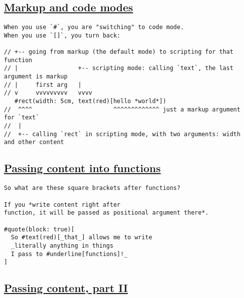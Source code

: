 \pandocbounded{}

\subsection{\texorpdfstring{\hyperref[markup-and-code-modes]{Markup and
code modes}}{Markup and code modes}}\label{markup-and-code-modes}

\begin{verbatim}
When you use `#`, you are "switching" to code mode.
When you use `[]`, you turn back:

// +-- going from markup (the default mode) to scripting for that function
// |                 +-- scripting mode: calling `text`, the last argument is markup
// |     first arg   |
// v     vvvvvvvvv   vvvv
   #rect(width: 5cm, text(red)[hello *world*])
//  ^^^^                       ^^^^^^^^^^^^^ just a markup argument for `text`
//  |
//  +-- calling `rect` in scripting mode, with two arguments: width and other content
\end{verbatim}

\pandocbounded{}

\subsection{\texorpdfstring{\hyperref[passing-content-into-functions]{Passing
content into
functions}}{Passing content into functions}}\label{passing-content-into-functions}

\begin{verbatim}
So what are these square brackets after functions?

If you *write content right after
function, it will be passed as positional argument there*.

#quote(block: true)[
  So #text(red)[_that_] allows me to write
  _literally anything in things
  I pass to #underline[functions]!_
]
\end{verbatim}

\pandocbounded{}

\subsection{\texorpdfstring{\hyperref[passing-content-part-ii]{Passing
content, part
II}}{Passing content, part II}}\label{passing-content-part-ii}

